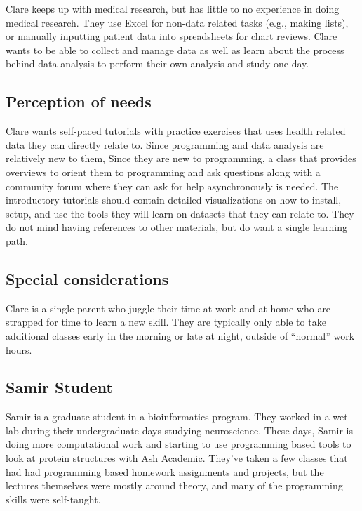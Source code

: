 \documentclass[020-persona\_validation.tex]{subfiles}
\begin{document}
            Clare keeps up with medical research,
            but has little to no experience in doing medical research.
            They use Excel for non-data related tasks (e.g., making lists),
            or manually inputting patient data into spreadsheets for chart reviews.
            Clare wants to be able to collect and manage data as well as
            learn about the process behind data analysis to perform their own analysis and study one day.

        \subsection{Perception of needs}

            Clare wants self-paced tutorials with practice exercises that uses health related data they can directly relate to.
            Since programming and data analysis are relatively new to them,
            Since they are new to programming,
            a class that provides overviews to orient them to programming and ask questions along with
            a community forum where they can ask for help asynchronously is needed.
            The introductory tutorials should contain detailed visualizations on how to install, setup, and use
            the tools they will learn on datasets that they can relate to.
            They do not mind having references to other materials,
            but do want a single learning path.

        \subsection{Special considerations}

            Clare is a single parent who juggle their time at work and at home who are strapped for time to learn a new skill.
            They are typically only able to take additional classes early in the morning or late at night,
            outside of ``normal'' work hours.

    \subsection{Samir Student}

        Samir is a graduate student in a bioinformatics program.
        They worked in a wet lab during their undergraduate days studying neuroscience.
        These days, Samir is doing more computational work and
        starting to use programming based tools to look at protein structures with Ash Academic.
        They've taken a few classes that had had programming based homework assignments and projects,
        but the lectures themselves were mostly around theory, and many of the programming skills were self-taught.
\end{document}
